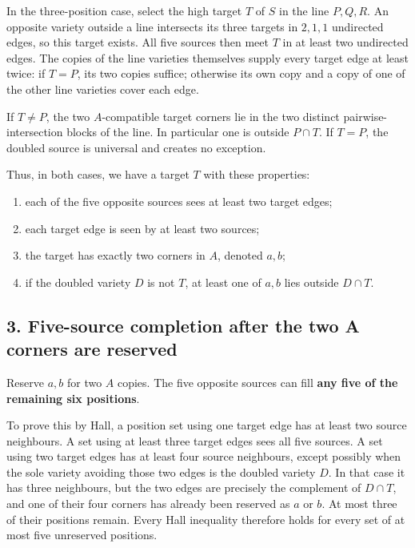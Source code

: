 \documentclass[
  10pt,
]{article}
\providecommand{\tightlist}{%
  \setlength{\itemsep}{0pt}\setlength{\parskip}{0pt}}
\begin{document}
In the three-position case, select the high target \(T\) of \(S\) in the
line \(P,Q,R\). An opposite variety outside a line intersects its three
targets in \(2,1,1\) undirected edges, so this target exists. All five
sources then meet \(T\) in at least two undirected edges. The copies of
the line varieties themselves supply every target edge at least twice:
if \(T=P\), its two copies suffice; otherwise its own copy and a copy of
one of the other line varieties cover each edge.

If \(T\ne P\), the two \(A\)-compatible target corners lie in the two
distinct pairwise-intersection blocks of the line. In particular one is
outside \(P\cap T\). If \(T=P\), the doubled source is universal and
creates no exception.

Thus, in both cases, we have a target \(T\) with these properties:

\begin{enumerate}
\def\labelenumi{\arabic{enumi}.}
\tightlist
\item
  each of the five opposite sources sees at least two target edges;
\item
  each target edge is seen by at least two sources;
\item
  the target has exactly two corners in \(A\), denoted \(a,b\);
\item
  if the doubled variety \(D\) is not \(T\), at least one of \(a,b\)
  lies outside \(D\cap T\).
\end{enumerate}

\hypertarget{five-source-completion-after-the-two-a-corners-are-reserved}{%
\subsection*{3. Five-source completion after the two A corners are
reserved}\label{five-source-completion-after-the-two-a-corners-are-reserved}}

Reserve \(a,b\) for two \(A\) copies. The five opposite sources can fill
\textbf{any five of the remaining six positions}.

To prove this by Hall, a position set using one target edge has at least
two source neighbours. A set using at least three target edges sees all
five sources. A set using two target edges has at least four source
neighbours, except possibly when the sole variety avoiding those two
edges is the doubled variety \(D\). In that case it has three
neighbours, but the two edges are precisely the complement of
\(D\cap T\), and one of their four corners has already been reserved as
\(a\) or \(b\). At most three of their positions remain. Every Hall
inequality therefore holds for every set of at most five unreserved
positions.
\end{document}
